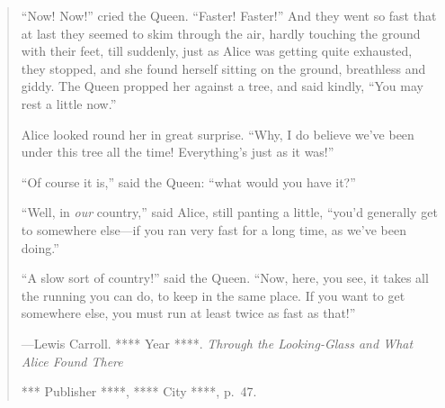 

\cleardoublepage{}

\thispagestyle{empty} %

\vspace*{50 mm}

\small{}

\begin{quote}
	``Now! Now!'' cried the Queen. 
	``Faster! Faster!'' 
	And they went so fast that at last they seemed to skim through the air, 
	hardly touching the ground with their feet, 
	till suddenly, 
	just as Alice was getting quite exhausted, 
	they stopped, 
	and she found herself sitting on the ground, 
	breathless and giddy. 
	The Queen propped her against a tree, and said kindly, 
	``You may rest a little now.''

	Alice looked round her in great surprise. 
	``Why, I do believe we've been under this tree all the time! 
	Everything's just as it was!''

	``Of course it is,'' said the Queen: ``what would you have it?'' %

	``Well, in \emph{our} country,'' said Alice, still panting a little, %
	``you'd generally get to somewhere else---if you ran very fast for a long time, 
	as we've been doing.''

	``A slow sort of country!'' said the Queen. 
	``Now, here, you see, it takes all the running you can do, to keep in the same place. 
	If you want to get somewhere else, you must run at least twice as fast as that!''

	\vspace{3 mm} %
	
	{
		\setlength{\parskip}{0.0pt} %
		\hfill---Lewis Carroll. **** Year ****.
				 \emph{Through the Looking-Glass and What Alice Found There}
	
		\hfill **** Publisher ****, **** City ****, p.~47.
	}
	
\end{quote}

\normalsize{}
